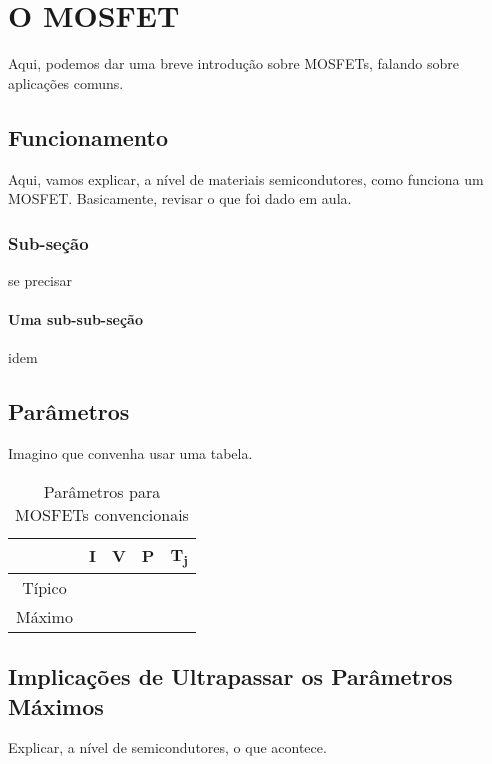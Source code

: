 \documentclass[portugues]{./ppgccufmg}
\begin{document}
	
	\chapter{O MOSFET}
		Aqui, podemos dar uma breve introdução sobre MOSFETs, falando sobre aplicações comuns.
		
		\section{Funcionamento}
			Aqui, vamos explicar, a nível de materiais semicondutores, como funciona um MOSFET. Basicamente, revisar o que foi dado em aula.
			
			\subsection{Sub-seção}
			se precisar
				\subsubsection{Uma sub-sub-seção}
					idem

		\section{Parâmetros}
			Imagino que convenha usar uma tabela.

			\begin{table}[ht]
				\centering
				\begin{tabular}{|c|c|c|c|c|}
				\hline
								& I & V & P & T\textsubscript{j} \\ \hline
				Típico	&   &   &   &										 \\ \hline
				Máximo	&   &   &   &										 \\ \hline
				\end{tabular}
				\caption{Parâmetros para MOSFETs convencionais}
				\label{tab:mosfet_convencional_param}
			\end{table}

		\section{Implicações de Ultrapassar os Parâmetros Máximos}
			Explicar, a nível de semicondutores, o que acontece.
\end{document}
